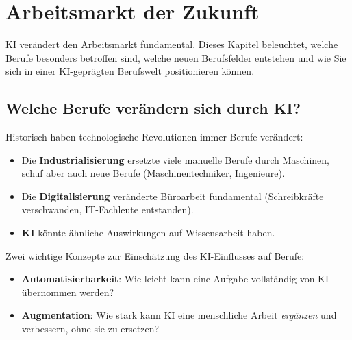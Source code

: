\chapter{Arbeitsmarkt der Zukunft}\label{ch:K07_Arbeitsmarkt}

\begin{myremark}
KI verändert den Arbeitsmarkt fundamental. Dieses Kapitel beleuchtet, welche Berufe
besonders betroffen sind, welche neuen Berufsfelder entstehen und wie Sie sich in
einer KI-geprägten Berufswelt positionieren können.
\end{myremark}

\section{Welche Berufe verändern sich durch KI?}

\begin{myexample}
Historisch haben technologische Revolutionen immer Berufe verändert:
\begin{itemize}
    \item Die \textbf{Industrialisierung} ersetzte viele manuelle Berufe durch
          Maschinen, schuf aber auch neue Berufe (Maschinentechniker, Ingenieure).
    \item Die \textbf{Digitalisierung} veränderte Büroarbeit fundamental
          (Schreibkräfte verschwanden, IT-Fachleute entstanden).
    \item \textbf{KI} könnte ähnliche Auswirkungen auf Wissensarbeit haben.
\end{itemize}
\end{myexample}

\begin{mydefinition}
Zwei wichtige Konzepte zur Einschätzung des KI-Einflusses auf Berufe:
\begin{itemize}
    \item \textbf{Automatisierbarkeit}: Wie leicht kann eine Aufgabe vollständig
          von KI übernommen werden?
    \item \textbf{Augmentation}: Wie stark kann KI eine menschliche Arbeit
          \emph{ergänzen} und verbessern, ohne sie zu ersetzen?
\end{itemize}
\end{mydefinition}

